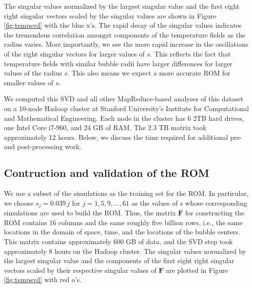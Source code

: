 \documentclass[final]{siamltex}
\providecommand{\mat}[1]{\boldsymbol{#1}}
\providecommand{\mF}{\ensuremath{\mat{F}}}
\begin{document}
The singular values normalized by the largest singular value and the
first eight right singular vectors scaled by the singular values are
shown in Figure \ref{fig:tempsvd} with the blue x's. The rapid decay
of the singular values indicates the tremendous correlation amongst
components of the temperature fields as the radius varies. More
importantly, we see the more rapid increase in the oscillations of the
right singular vectors for larger values of $s$. This reflects the
fact that temperature fields with similar bubble radii have larger
differences for larger values of the radius $s$. This also means we
expect a more accurate ROM for smaller values of $s$.

We computed this SVD and all other MapReduce-based analyses of this
dataset on a 10-node Hadoop cluster at Stanford University's Institute
for Computational and Mathematical Engineering. Each node in the
cluster has 6 2TB hard drives, one Intel Core i7-960, and 24 GB of
RAM. The 2.3 TB matrix took approximately 12 hours. Below, we discuss
the time required for additional pre- and post-processing work.

\subsection{Contruction and validation of the ROM}
\label{sec:romexample}
We use a subset of the simulations as the training set for the
ROM. In particular, we choose $s_j = 0.039\,j$ for $j=1,5,9,\dots,61$
as the values of $s$ whose corresponding simulations are used to build
the ROM. Thus, the matrix $\mF$ for constructing the ROM contains 16
columns and the same roughly five billion rows, i.e., the same
locations in the domain of space, time, and the locations of the
bubble centers. This matrix contains approximately 600 GB of data, and
the SVD step took approximately 8 hours on the Hadoop cluster.
The singular values normalized by the largest singular value and the
components of the first eight right singular vectors scaled by their
respective singular values of $\mF$ are plotted in Figure
\ref{fig:tempsvd} with red o's.
\end{document}
